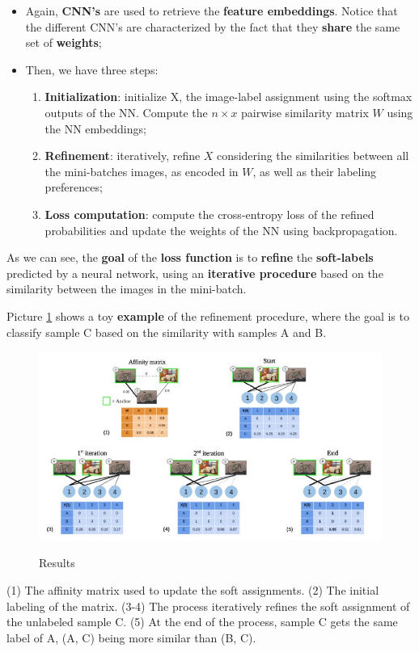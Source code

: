 \begin{itemize}
    \item Again, \textbf{CNN's} are used to retrieve the \textbf{feature embeddings}. Notice that the different CNN's are characterized by the fact that they \textbf{share} the same set of \textbf{weights};
    \item Then, we have three steps:
    \begin{enumerate}
        \item \textbf{Initialization}: initialize X, the image-label assignment using the softmax outputs of the NN. Compute the $n \times x$ pairwise similarity matrix $W$ using the NN embeddings;
        \item \textbf{Refinement}: iteratively, refine $X$ considering the similarities between all the mini-batches images, as encoded in $W$, as well as their labeling preferences;
        \item \textbf{Loss computation}: compute the cross-entropy loss of the refined probabilities and update the weights of the NN using backpropagation.
    \end{enumerate}
\end{itemize}

As we can see, the \textbf{goal} of the \textbf{loss function} is to \textbf{refine} the \textbf{soft-labels} predicted by a neural network, using an \textbf{iterative procedure} based on the similarity between the images in the mini-batch.

Picture \ref{camc17} shows a toy \textbf{example} of the refinement procedure, where the goal is to classify sample C based on the similarity with samples A and B. 

\begin{figure}[h!]
    \centering
    \includegraphics[scale = 1.7]{img/camc17.jpg}
    \label{camc17}
    \caption{Results}
\end{figure}

(1) The affinity matrix used to update the soft assignments. (2) The initial labeling of the matrix. (3-4) The process iteratively refines the soft assignment of the unlabeled sample C. (5) At the end of the process, sample C
gets the same label of A, (A, C) being more similar than (B, C).